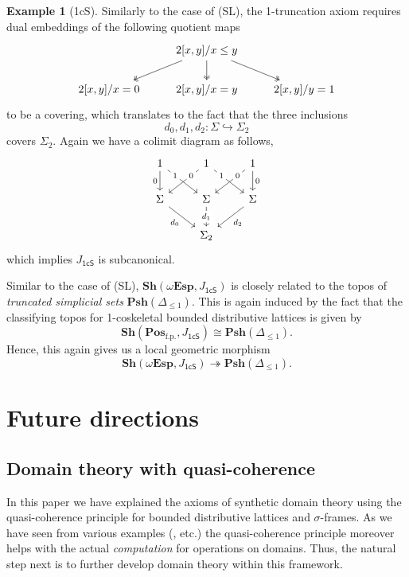 \documentclass[a4paper,12pt]{amsart}
\theoremstyle{definition}
\newtheorem{example}[theorem]{Example}
\newcommand{\mb}[1]{\mathbf{#1}}
\newcommand{\mr}[1]{\mathrm{#1}}
\newcommand{\ms}[1]{\mathsf{#1}}
\newcommand{\Pos}{\mb{Pos}}
\newcommand{\sh}{\mb{Sh}}
\newcommand{\psh}{\mb{Psh}}
\newcommand{\surj}{\twoheadrightarrow}
\newcommand{\hook}{\hookrightarrow}
\newcommand{\fp}{_{\mr{f.p.}}}
\newcommand{\wTop}{\omega\mb{Esp}}
\begin{document}
\begin{example}[1cS]\label{exm:model1T}
  Similarly to the case of (SL), the 1-truncation axiom requires dual embeddings of the following quotient maps
  \[\begin{tikzcd}
    & {2[x,y]/x\le y} \\
    {2[x,y]/x=0} & {2[x,y]/x=y} & {2[x,y]/y=1}
    \arrow[two heads, from=1-2, to=2-1]
    \arrow[two heads, from=1-2, to=2-2]
    \arrow[two heads, from=1-2, to=2-3]
  \end{tikzcd}\]
  to be a covering, which translates to the fact that the three inclusions
  \[ d_0,d_1,d_2 : \Sigma \hook \Sigma_2 \]
  covers $\Sigma_2$. Again we have a colimit diagram as follows, 
  \[\begin{tikzcd}
    1 & 1 & 1 \\
    \Sigma & \Sigma & \Sigma \\
    & {\Sigma_2}
    \arrow["0"', from=1-1, to=2-1]
    \arrow["1"{description, pos=0.25}, from=1-1, to=2-2]
    \arrow["0"{description, pos=0.25}, from=1-2, to=2-1]
    \arrow["1"{description, pos=0.25}, from=1-2, to=2-3]
    \arrow["0"{description, pos=0.25}, from=1-3, to=2-2]
    \arrow["0", from=1-3, to=2-3]
    \arrow["{d_0}"', from=2-1, to=3-2]
    \arrow["{d_1}"{description}, from=2-2, to=3-2]
    \arrow["{d_2}", from=2-3, to=3-2]
  \end{tikzcd}\]
  which implies $J_{\ms{1cS}}$ is subcanonical.
  
  Similar to the case of (SL), $\sh(\wTop,J_{\ms{1cS}})$ is closely related to the topos of \emph{truncated simplicial sets} $\psh(\Delta_{\le 1})$. This is again induced by the fact that the classifying topos for 1-coskeletal bounded distributive lattices is given by 
  \[ \sh(\Pos\fp,J_{\ms{1cS}}) \cong \psh(\Delta_{\le 1}). \]
  Hence, this again gives us a local geometric morphism
  \[ \sh(\wTop,J_{\ms{1cS}}) \surj \psh(\Delta_{\le 1}). \]
\end{example}


\section{Future directions}

\subsection{Domain theory with quasi-coherence}

In this paper we have explained the axioms of synthetic domain theory using the quasi-coherence principle for bounded distributive lattices and $\sigma$-frames. As we have seen from various examples (,  etc.) the quasi-coherence principle moreover helps with the actual \emph{computation} for operations on domains. Thus, the natural step next is to further develop domain theory within this framework.
\end{document}
